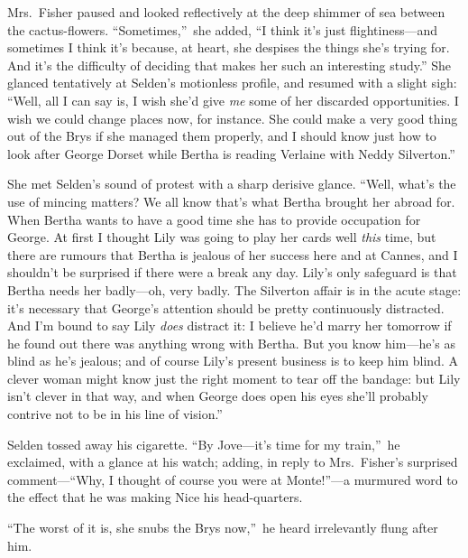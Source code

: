 \documentclass[12pt,a4paper]{book}
\begin{document}
Mrs.\ Fisher paused and looked reflectively at the deep shimmer of
sea between the cactus-flowers. ``Sometimes,''\ she added, ``I think
it's just flightiness---and sometimes I think it's because, at
heart, she despises the things she's trying for. And it's the
difficulty of deciding that makes her such an interesting study.'' 
She glanced tentatively at Selden's motionless profile, and
resumed with a slight sigh: ``Well, all I can say is, I wish she'd
give \textit{me} some of her discarded opportunities. I wish we could
change places now, for instance. She could make a very good thing
out of the Brys if she managed them properly, and I should know
just how to look after George Dorset while Bertha is reading
Verlaine with Neddy Silverton.''





She met Selden's sound of protest with a sharp derisive glance. 
``Well, what's the use of mincing matters? We all know that's what
Bertha brought her abroad for. When Bertha wants to have a good
time she has to provide occupation for George. At first I thought
Lily was going to play her cards well \textit{this} time, but there are
rumours that Bertha is jealous of her success here and at Cannes,
and I shouldn't be surprised if there were a break any
day. Lily's only safeguard is that Bertha needs her badly---oh,
very badly. The Silverton affair is in the acute stage: it's
necessary that George's attention should be pretty continuously
distracted. And I'm bound to say Lily \textit{does} distract it: I believe
he'd marry her tomorrow if he found out there was anything wrong
with Bertha. But you know him---he's as blind as he's jealous; and
of course Lily's present business is to keep him blind. A clever
woman might know just the right moment to tear off the bandage: 
but Lily isn't clever in that way, and when George does open his
eyes she'll probably contrive not to be in his line of vision.''





Selden tossed away his cigarette. ``By Jove---it's time for my
train,''\ he exclaimed, with a glance at his watch; adding, in
reply to Mrs.\ Fisher's surprised comment---``Why, I thought of
course you were at Monte!''---a murmured word to the effect that he
was making Nice his head-quarters.





``The worst of it is, she snubs the Brys now,''\ he heard
irrelevantly flung after him.
\end{document}
